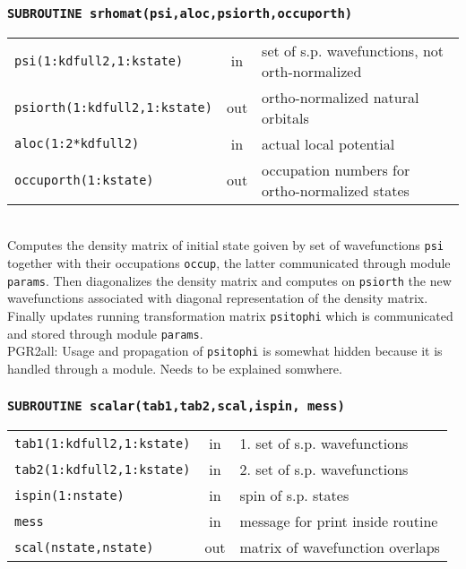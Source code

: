 \documentclass[final,1p]{elsarticle}
\newcommand{\PGRcomm}[1]{{\color{blue}\small PGR2all: #1}}
\begin{document}
\subsubsection*{\tt SUBROUTINE srhomat(psi,aloc,psiorth,occuporth)}
\begin{tabular}{lcl}
 {\tt psi(1:kdfull2,1:kstate)} & in & set of s.p. wavefunctions, not orth-normalized\\
 {\tt psiorth(1:kdfull2,1:kstate)} & out & ortho-normalized natural orbitals\\
 {\tt aloc(1:2*kdfull2)} & in & actual local potential\\
 {\tt occuporth(1:kstate)} & out & occupation numbers for
 ortho-normalized states\\
\end{tabular}
\\[4pt] Computes the density matrix of initial state goiven by set of
wavefunctions {\tt psi} together with their occupations {\tt occup},
the latter communicated through module {\tt params}.  Then
diagonalizes the density matrix and computes on {\tt psiorth} the new
wavefunctions associated with diagonal representation of the density
matrix.  
\\
Finally updates running transformation matrix {\tt psitophi} which is
communicated and stored through module {\tt params}.
\\
\PGRcomm{Usage and propagation of  {\tt psitophi} is somewhat hidden
  because it is handled through a module. Needs to be explained somwhere.}


\subsubsection*{\tt SUBROUTINE scalar(tab1,tab2,scal,ispin, mess)}
\begin{tabular}{lcl}
 {\tt tab1(1:kdfull2,1:kstate)} & in & 1. set of s.p. wavefunctions\\
 {\tt tab2(1:kdfull2,1:kstate)} & in & 2. set of s.p. wavefunctions\\
 {\tt ispin(1:nstate)} & in & spin of s.p. states\\
 {\tt mess} & in & message for print inside routine\\
 {\tt scal(nstate,nstate)} & out & matrix of wavefunction overlaps\\
\end{tabular}
\\[4pt]
\end{document}

